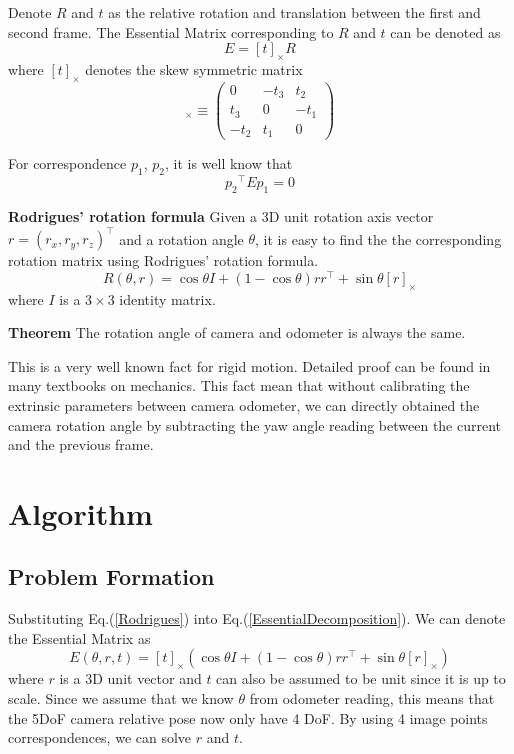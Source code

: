 \documentclass{article}
\begin{document}
Denote $R$ and $t$ as the relative rotation and translation between the first and second frame. The Essential Matrix corresponding to $R$ and $t$ can be denoted as 
\begin{equation}
\label{EssentialDecomposition}
E = [t]_\times R
\end{equation}
where $[t]_\times$ denotes the skew symmetric matrix
\begin{equation}
[t]_\times \equiv \left(
	\begin{array}{clr}
		0 & -t_3 & t_2 \\
		t_3 & 0 & -t_1 \\
		-t_2 & t_1 & 0
	\end{array}
\right)	
\end{equation}

For correspondence $p_1$, $p_2$, it is well know that
\begin{equation}
\label{EpipolarConstraints}
{p_2}^\top E p_1 = 0
\end{equation}

\textbf{Rodrigues' rotation formula} 
Given a 3D unit rotation axis vector $r = (r_x, r_y, r_z)^\top$ and a rotation angle $\theta$, it is easy to find the the corresponding rotation matrix using Rodrigues' rotation formula. 
\begin{equation}
\label{Rodrigues}
R(\theta, r) = \cos \theta I + (1 - \cos \theta) r r^\top + \sin \theta [ r ]_\times
\end{equation}
where $I$ is a $3 \times 3$ identity matrix. 

\textbf{Theorem}
The rotation angle of camera and odometer is always the same. 

This is a very well known fact for rigid motion. Detailed proof can be found in many textbooks on mechanics. This fact mean that without calibrating the extrinsic parameters between camera odometer, we can directly obtained the camera rotation angle by subtracting the yaw angle reading between the current and the previous frame. 


\section{Algorithm}
\label{Algorithm}

\subsection{Problem Formation}
Substituting Eq.(\ref{Rodrigues}) into Eq.(\ref{EssentialDecomposition}). We can denote the Essential Matrix as 
\begin{equation}
E(\theta, r, t) = [t]_\times \left( \cos \theta I + (1 - \cos \theta) r r^\top + \sin \theta [ r ]_\times \right)
\end{equation}
where $r$ is a 3D unit vector and $t$ can also be assumed to be unit since it is up to scale. Since we assume that we know $\theta$ from odometer reading, this means that the 5DoF camera relative pose now only have 4 DoF. By using 4 image points correspondences, we can solve $r$ and $t$. 
\end{document}
